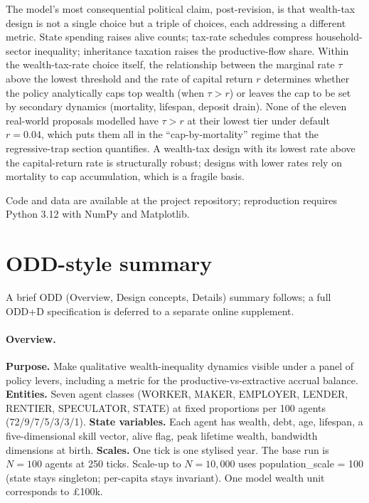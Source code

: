 \documentclass[11pt]{article}
\begin{document}
The model's most consequential political claim, post-revision, is
that wealth-tax design is not a single choice but a triple of
choices, each addressing a different metric. State spending raises
alive counts; tax-rate schedules compress household-sector inequality;
inheritance taxation raises the productive-flow share. Within the
wealth-tax-rate choice itself, the relationship between the
marginal rate $\tau$ above the lowest threshold and the rate of
capital return $r$ determines whether the policy analytically caps
top wealth (when $\tau > r$) or leaves the cap to be set by
secondary dynamics (mortality, lifespan, deposit drain). None of
the eleven real-world proposals modelled have $\tau > r$ at their
lowest tier under default $r=0.04$, which puts them all in the
``cap-by-mortality'' regime that the regressive-trap section
quantifies. A wealth-tax design with its lowest rate above the
capital-return rate is structurally robust; designs with lower rates
rely on mortality to cap accumulation, which is a fragile basis.

Code and data are available at the project repository; reproduction
requires Python 3.12 with NumPy and Matplotlib.




\appendix

\section{ODD-style summary}
\label{app:odd}

A brief ODD (Overview, Design concepts, Details) summary follows;
a full ODD+D specification is deferred to a separate online supplement.

\paragraph{Overview.}
\textbf{Purpose.} Make qualitative wealth-inequality dynamics
visible under a panel of policy levers, including a metric for the
productive-vs-extractive accrual balance.
\textbf{Entities.} Seven agent classes
(WORKER, MAKER, EMPLOYER, LENDER, RENTIER, SPECULATOR, STATE) at
fixed proportions per 100 agents (72/9/7/5/3/3/1).
\textbf{State variables.} Each agent has wealth, debt, age,
lifespan, a five-dimensional skill vector, alive flag, peak
lifetime wealth, bandwidth dimensions at birth.
\textbf{Scales.} One tick is one stylised year. The base run is
$N=100$ agents at 250 ticks. Scale-up to $N=10{,}000$ uses
population\_scale = 100 (state stays singleton; per-capita stays
invariant). One model wealth unit corresponds to \pounds100k.
\end{document}
